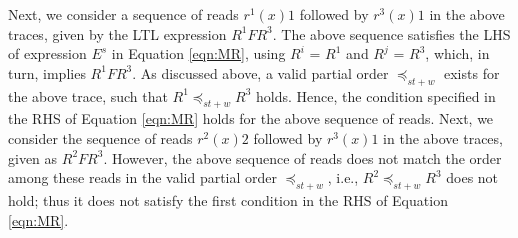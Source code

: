 \documentclass[journal,compsoc]{IEEEtran}
\begin{document}
   Next, we consider a sequence of reads $r^1(x){1}$ followed by $r^3(x){1}$ in the above traces, given by the LTL expression $R^1 F R^3$. 
   The above sequence satisfies the LHS of expression $E^s$ in Equation
   \ref{eqn:MR}, using 
  $R^i$ = $R^1$ and $R^j$ = $R^3$, which, in turn, implies  $R^1 F R^3 $. %
   As discussed above, a 
  valid partial order $\preccurlyeq_{\mathit{st}+w}$ exists for the above trace, such that $R^1 \preccurlyeq_{\mathit{st}+w} R^3$
  holds. Hence, the condition specified in the RHS of Equation \ref{eqn:MR} holds for the above sequence of reads.
   Next, we consider the sequence of reads $r^2(x){2}$ followed by $r^3(x){1}$ in the above traces, given
  as $R^2 F R^3$. However, the above sequence of reads does not match the order among these reads in the valid partial order  $\preccurlyeq_{\mathit{st}+w}$, i.e.,
  $R^2 \preccurlyeq_{\mathit{st}+w} R^3$ does not hold;
    thus it does not satisfy the first condition in the RHS of Equation \ref{eqn:MR}. 
\end{document}
